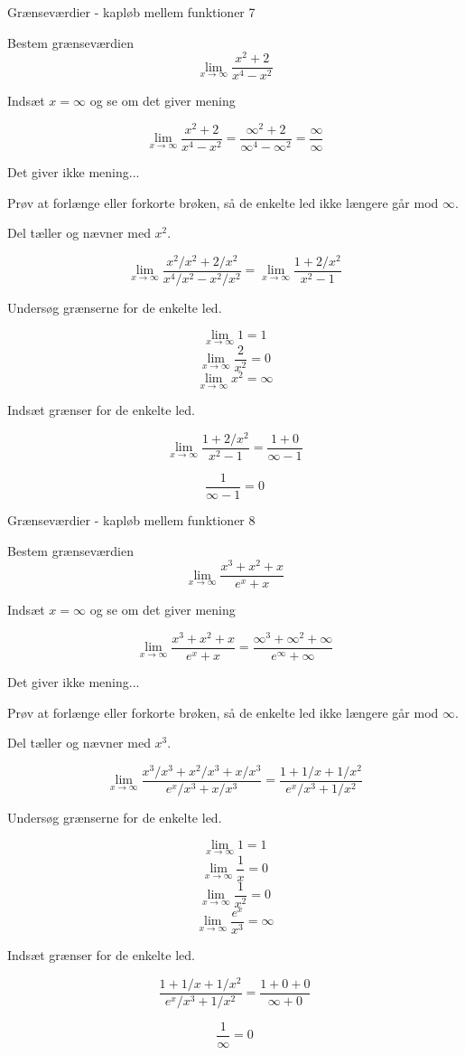 \documentclass{article}
\begin{document}
\begin{exercise}{Grænseværdier - kapløb mellem funktioner 7}

Bestem grænseværdien
\[
\lim_{x \to \infty} \frac{x^2 + 2}{x^4 - x^2}
\]


\hint
Indsæt $x=\infty$ og se om det giver mening

\hint
\[
\lim_{x \to \infty} \frac{x^2 + 2}{x^4 - x^2} = \frac{\infty^2 + 2}{\infty^4 - \infty^2} = \frac{\infty}{\infty}
\]

\hint
Det giver ikke mening...

\hint
Prøv at forlænge eller forkorte brøken, så de enkelte led ikke længere går mod $\infty$.

\hint
Del tæller og nævner med $x^2$.

\hint
\[
\lim_{x \to \infty} \frac{x^2/x^2 + 2/x^2}{x^4/x^2 - x^2/x^2} = \lim_{x \to \infty} \frac{1 + 2/x^2}{x^2 - 1}
\]

\hint
Undersøg grænserne for de enkelte led.

\hint
\[
\lim_{x \to \infty} 1 = 1
\]
\[
\lim_{x \to \infty} \frac{2}{x^2} = 0
\]
\[
\lim_{x \to \infty} x^2 = \infty
\]

\hint
Indsæt grænser for de enkelte led.

\hint
\[
\lim_{x \to \infty} \frac{1 + 2/x^2}{x^2 - 1} = \frac{1 + 0}{\infty - 1}
\]

\hint
\[
 \frac{1}{\infty - 1} = 0
\]

\end{exercise}
\newpage

\begin{exercise}{Grænseværdier - kapløb mellem funktioner 8}

Bestem grænseværdien
\[
\lim_{x \to \infty} \frac{x^3 + x^2 + x}{e^x + x}
\]


\hint
Indsæt $x=\infty$ og se om det giver mening

\hint
\[
\lim_{x \to \infty} \frac{x^3 + x^2 + x}{e^x + x} = \frac{\infty^3 + \infty^2 + \infty}{e^\infty + \infty}
\]

\hint
Det giver ikke mening...

\hint
Prøv at forlænge eller forkorte brøken, så de enkelte led ikke længere går mod $\infty$.

\hint
Del tæller og nævner med $x^3$.

\hint
\[
\lim_{x \to \infty} \frac{x^3/x^3 + x^2/x^3 + x/x^3}{e^x/x^3 + x/x^3} = \frac{1 + 1/x + 1/x^2}{e^x/x^3 + 1/x^2}
\]

\hint
Undersøg grænserne for de enkelte led.

\hint
\[
\lim_{x \to \infty} 1 = 1
\]
\[
\lim_{x \to \infty} \frac{1}{x} = 0
\]
\[
\lim_{x \to \infty} \frac{1}{x^2} = 0
\]
\[
\lim_{x \to \infty} \frac{e^x}{x^3} = \infty
\]

\hint
Indsæt grænser for de enkelte led.

\hint
\[
\frac{1 + 1/x + 1/x^2}{e^x/x^3 + 1/x^2} = \frac{1 + 0 + 0}{\infty + 0}
\]

\hint
\[
\frac{1 }{\infty } = 0
\]

\end{exercise}
\newpage
\end{document}
